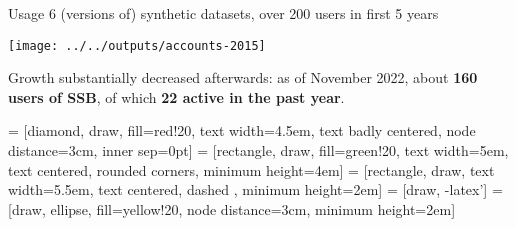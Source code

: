 \begin{frame}{Usage}
6 (versions of) synthetic datasets, over 200 users in first 5 years
\begin{center}
	\texttt{[image: ../../outputs/accounts-2015]}
\end{center}
\footnotesize Growth substantially decreased afterwards: as of November 2022, about \textbf{160 users of SSB}, of which \textbf{22 active in the past year}.
\end{frame}



 = [diamond, draw, 
                    fill=red!20, 
                    text width=4.5em, text badly centered, 
                    node distance=3cm, inner sep=0pt]
 = [rectangle, draw, 
                    fill=green!20, 
                    text width=5em, text centered, 
                    rounded corners, minimum height=4em]
 = [rectangle, draw, 
                    text width=5.5em, text centered, 
                    dashed , minimum height=2em]
 = [draw, -latex']
 = [draw, ellipse,
                    fill=yellow!20, 
                    node distance=3cm,
                    minimum height=2em]
\newcommand{\blockdef}{%
\node [block,fill=white] (init) {request access SDS};
	\node [block, right of=init, node distance=3cm,fill=public] (develop) {develop model};
	\node [cloud, left of=init,fill=public] (researcher) {researcher};
	\node [block, below of=develop,fill=public] (submit) {submit code};
	\node [block, below of=submit, node distance=2.5cm,fill=public] (reproSDS) {reproduce on synthetic data};
	\node [cloud, right of=submit] (system) {NSI analyst};
	\node [block, right of=reproSDS, node distance=3cm,fill=restricted] (reproConf) {reproduce on confidential data};
	\node [decision, below of=reproConf,fill=restricted] (decide) {disclosure analysis};
    \node [block,left of=decide,node distance=9cm,fill=published] (publication) {publish results};
	\node [cloud, right of=decide, , align=center, node distance=4cm] (drb) {NSI disclosure \\ review board};
	
	\node [legend,below of=decide,fill=restricted] (legendConf) {secure area};
	\node [legend,left of=legendConf,fill=public,node distance=3cm] (legendPublic) {public area};
 }
